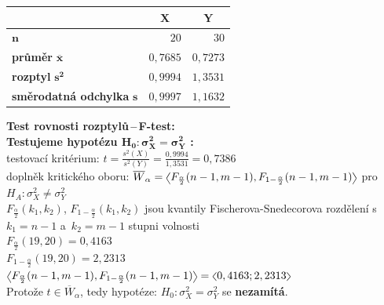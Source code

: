 \documentclass[a4paper, 11pt]{article}
\newcommand{\intlr}[1]{\scaleleftright[1ex]{<}{#1}{>}}
\begin{document}
	\begin{table}[H]
		\begin{tabular}{l|r|r}
			& \multicolumn{1}{c}{$ \boldsymbol{X} $}
			& \multicolumn{1}{c}{$ \boldsymbol{Y} $} \\ \hline

			$ \boldsymbol{n} $ & $ 20 $ & $ 30 $ \\

			\textbf{průměr} $ \boldsymbol{\overline{x}} $ & $ 0,7685 $
			& $ 0,7273 $ \\

			\textbf{rozptyl} $ \boldsymbol{s^2} $ & $ 0,9994 $
			& $ 1,3531 $ \\

			\textbf{směrodatná odchylka} $ \boldsymbol{s} $ & $ 0,9997 $
			& $ 1,1632 $ \\
		\end{tabular}
	\end{table}

	\textbf{Test rovnosti rozptylů\,--\,F-test:} \\
	\textbf{Testujeme hypotézu $ \boldsymbol{H_0 : \sigma_X^2 =
	\sigma_Y^2} $ :} \\
	testovací kritérium: $ t = \frac{s^2(X)}{s^2(Y)} = \frac{0,9994}{1,3531} =
	0,7386 $ \\
	doplněk kritického oboru: $ \overline{W}_\alpha =
	\intlr{F_{\frac{\alpha}{2}}(n - 1, m - 1), F_{1 - \frac{\alpha}{2}}(n - 1,
	m - 1)} $ pro $ H_A : \sigma_X^2 \neq \sigma_Y^2 $ \\
	$ F_{\frac{\alpha}{2}}(k_1, k_2) $, $ F_{1 - \frac{\alpha}{2}}(k_1, k_2) $
	jsou kvantily Fischerova-Snedecorova rozdělení s~$ k_1 = n - 1 $ a~$ k_2 =
	m - 1 $ stupni volnosti \\
	$ F_{\frac{\alpha}{2}}(19, 20) = 0,4163 $ \\
	$ F_{1 - \frac{\alpha}{2}}(19, 20) = 2,2313 $ \\
	$ \intlr{F_{\frac{\alpha}{2}}(n - 1, m - 1), F_{1 - \frac{\alpha}{2}}(n
	- 1, m - 1)} = \intlr{0,4163; 2,2313} $ \\
	Protože $ t \in \overline{W}_\alpha $, tedy hypotéze: $ H_0 : \sigma_X^2 =
	\sigma_Y^2 $ se \textbf{nezamítá}.
\end{document}
